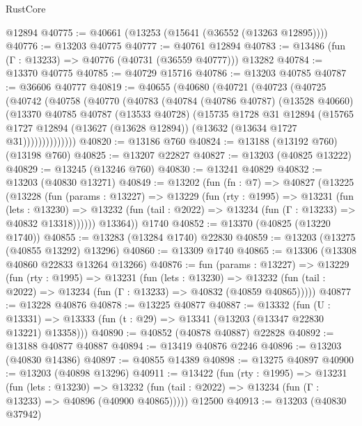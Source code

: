 \begin{lexlean}{RustCore}
\begin{coremodule}
    @12894
@40775 := @40661 (@13253 (@15641 (@36552 (@13263 @12895))))
@40776 := @13203 @40775
@40777 := @40761 @12894
@40783 := @13486 (fun (Γ : @13233) => @40776 (@40731 (@36559 @40777))) @13282
@40784 := @13370 @40775
@40785 := @40729 @15716
@40786 := @13203 @40785
@40787 := @36606 @40777
@40819 := @40655
    (@40680
      (@40721
        (@40723
          (@40725
            (@40742
              (@40758
                (@40770
                  (@40783
                    (@40784
                      (@40786 @40787)
                      (@13528 @40660)
                      (@13370
                        @40785
                        @40787
                        (@13533 @40728)
                        (@15735
                          @1728
                          @31
                          @12894
                          (@15765
                            @1727
                            @12894
                            (@13627 (@13628 @12894))
                            (@13632 (@13634 @1727 @31))))))))))))))
@40820 := @13186 @760
@40824 := @13188 (@13192 @760) (@13198 @760)
@40825 := @13207 @22827
@40827 := @13203 (@40825 @13222)
@40829 := @13245 (@13246 @760)
@40830 := @13241 @40829
@40832 := @13203 (@40830 @13271)
@40849 := @13202
    (fun (fn : @7) =>
    @40827
      (@13225
        (@13228
          (fun (params : @13227) =>
          @13229
            (fun (rty : @1995) =>
            @13231
              (fun (lets : @13230) =>
              @13232 (fun (tail : @2022) => @13234 (fun (Γ : @13233) => @40832 @13318))))))
        @13364))
    @1740
@40852 := @13370 (@40825 (@13220 @1740))
@40855 := @13283 (@13284 @1740) @22830
@40859 := @13203 (@13275 (@40855 @13292) @13296)
@40860 := @13309 @1740
@40865 := @13306 (@13308 @40860 @22833 @13264 @13266)
@40876 := fun (params : @13227) =>
  @13229
    (fun (rty : @1995) =>
    @13231
      (fun (lets : @13230) =>
      @13232 (fun (tail : @2022) => @13234 (fun (Γ : @13233) => @40832 (@40859 @40865)))))
@40877 := @13228 @40876
@40878 := @13225 @40877
@40887 := @13332
    (fun (U : @13331) => @13333 (fun (t : @29) => @13341 (@13203 (@13347 @22830 @13221) @13358)))
@40890 := @40852 (@40878 @40887) @22828
@40892 := @13188 @40877 @40887
@40894 := @13419 @40876 @2246
@40896 := @13203 (@40830 @14386)
@40897 := @40855 @14389
@40898 := @13275 @40897
@40900 := @13203 (@40898 @13296)
@40911 := @13422
    (fun (rty : @1995) =>
    @13231
      (fun (lets : @13230) =>
      @13232 (fun (tail : @2022) => @13234 (fun (Γ : @13233) => @40896 (@40900 @40865)))))
    @12500
@40913 := @13203 (@40830 @37942)

\end{coremodule}
\end{lexlean}
